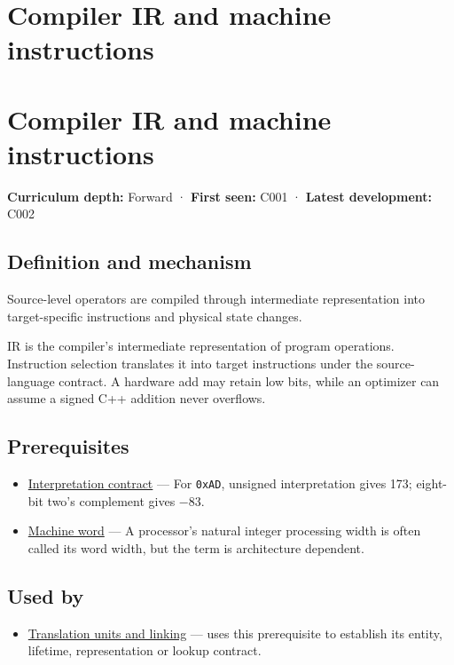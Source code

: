 \hypertarget{appendix-942ad41afb30}{}
\section*{Compiler IR and machine instructions}
\section{Compiler IR and machine instructions}\label{appendix-942ad41afb30-compiler-ir-and-machine-instructions}

\textbf{Curriculum depth:} Forward · \textbf{First seen:} C001 · \textbf{Latest development:} C002

\subsection{Definition and mechanism}\label{appendix-942ad41afb30-definition-and-mechanism}

Source-level operators are compiled through intermediate representation into target-specific instructions and physical state changes.

IR is the compiler's intermediate representation of program operations. Instruction selection translates it into target instructions under the source-language contract. A hardware add may retain low bits, while an optimizer can assume a signed C++ addition never overflows.

\subsection{Prerequisites}\label{appendix-942ad41afb30-prerequisites}

\begin{itemize}
\tightlist
\item
  \hyperref[appendix-f414bd4ed05c]{Interpretation contract} --- For \texttt{0xAD}, unsigned interpretation gives 173; eight-bit two's complement gives −83.
\item
  \hyperref[appendix-d67a19507dc5]{Machine word} --- A processor's natural integer processing width is often called its word width, but the term is architecture dependent.
\end{itemize}

\subsection{Used by}\label{appendix-942ad41afb30-used-by}

\begin{itemize}
\tightlist
\item
  \hyperref[appendix-806686359e1b]{Translation units and linking} --- uses this prerequisite to establish its entity, lifetime, representation or lookup contract.
\end{itemize}

